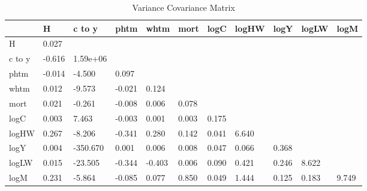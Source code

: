 \begin{table}[htbp]
\caption{\label{clabel} Variance Covariance Matrix}\centering\medskip
\begin{tabular}{lllllllllll} \hline \hline
 & H  & c to y  & phtm  & whtm  & mort  & logC  & logHW  & logY  & logLW  & logM  \\  \hline 
H &     0.027 \\  
c to y &    -0.616 &  1.59e+06 \\  
phtm &    -0.014 &    -4.500 &     0.097 \\  
whtm &     0.012 &    -9.573 &    -0.021 &     0.124 \\  
mort &     0.021 &    -0.261 &    -0.008 &     0.006 &     0.078 \\  
logC &     0.003 &     7.463 &    -0.003 &     0.001 &     0.003 &     0.175 \\  
logHW &     0.267 &    -8.206 &    -0.341 &     0.280 &     0.142 &     0.041 &     6.640 \\  
logY &     0.004 &  -350.670 &     0.001 &     0.006 &     0.008 &     0.047 &     0.066 &     0.368 \\  
logLW &     0.015 &   -23.505 &    -0.344 &    -0.403 &     0.006 &     0.090 &     0.421 &     0.246 &     8.622 \\  
logM &     0.231 &    -5.864 &    -0.085 &     0.077 &     0.850 &     0.049 &     1.444 &     0.125 &     0.183 &     9.749 \\  
\hline \hline \end{tabular}
\end{table}
